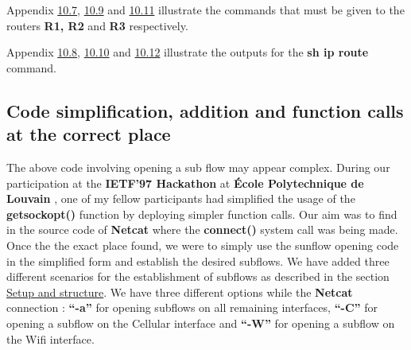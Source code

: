 \documentclass[a4paper,11pt]{article}
\begin{document}
			Appendix \hyperref[subsec:routerconf1]{10.7}, \hyperref[subsec:routerconf2]{10.9} and \hyperref[subsec:routerconf3]{10.11} illustrate the commands that must be given to the routers \textbf{R1, R2} and \textbf{R3} respectively.


			Appendix \hyperref[subsec:routerconfout1]{10.8}, \hyperref[subsec:routerconfout2]{10.10} and \hyperref[subsec:routerconfout3]{10.12} illustrate the outputs for the \textbf{sh ip route} command.

		\subsection{Code simplification, addition and function calls at the correct place}
			\label{subsec:codesimplify}
			The above code involving opening a sub flow may appear complex. During our participation at the \textbf{IETF'97 Hackathon} at \textbf{École Polytechnique de Louvain} \cite[hackathon]{ucl}, one of my fellow participants had simplified the usage of the \textbf{getsockopt()} function by deploying simpler function calls. Our aim was to find in the source code of \textbf{Netcat} where the \textbf{connect()} system call was being made. Once the the exact place found, we were to simply use the sunflow opening code in the simplified form and establish the desired subflows. We have added three different scenarios for the establishment of subflows as described in the section \hyperref[subsec:setup]{Setup and structure}. We have three different options while the \textbf{Netcat} connection : \textbf{``-a''} for opening subflows on all remaining interfaces, \textbf{``-C''} for opening a subflow on the Cellular interface and \textbf{``-W''} for opening a subflow on the Wifi interface.
\end{document}
